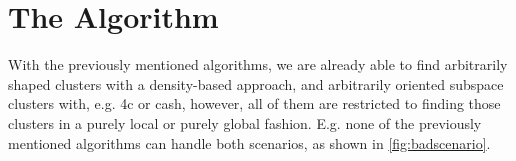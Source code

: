 \section{The Algorithm}
With the previously mentioned algorithms, we are already able to find arbitrarily shaped clusters with a density-based approach, and arbitrarily oriented subspace clusters with, e.g. \gls{4c} or \gls{cash}, however, all of them are restricted to finding those clusters in a purely local or purely global fashion. E.g. none of the previously mentioned algorithms can handle both scenarios, as shown in \autoref{fig:badscenario}.


